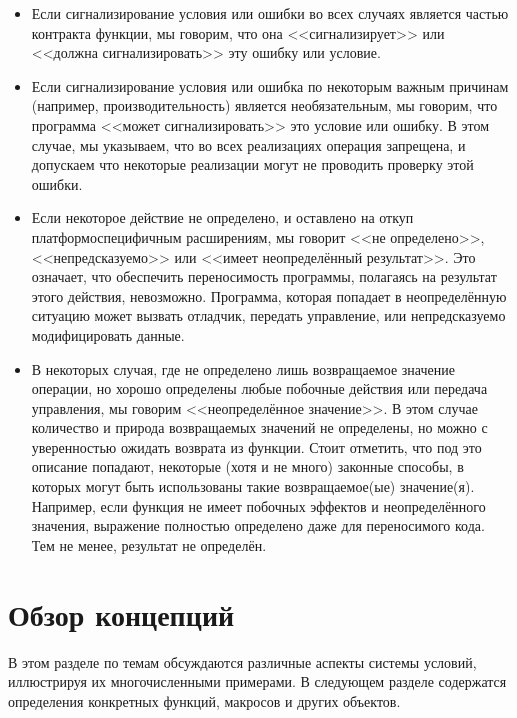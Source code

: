\begin{itemize}
\item Если сигнализирование условия или ошибки во всех случаях является частью
  контракта функции, мы говорим, что она <<сигнализирует>> или <<должна
  сигнализировать>> эту ошибку или условие.

\item Если сигнализирование условия или ошибка по некоторым важным причинам
  (например, производительность)
  является необязательным, мы говорим, что программа <<может сигнализировать>>
  это условие или ошибку. В этом случае, мы указываем, что во всех реализациях
  операция запрещена, и допускаем что некоторые реализации могут не проводить
  проверку этой ошибки.

\item Если некоторое действие не определено, и оставлено на откуп
  платформоспецифичным расширениям, мы говорит <<не определено>>,
  <<непредсказуемо>> или <<имеет неопределённый результат>>.
  Это означает, что обеспечить переносимость программы, полагаясь на результат
  этого действия, невозможно. Программа, которая попадает в неопределённую
  ситуацию может вызвать отладчик, передать управление, или непредсказуемо
  модифицировать данные.

\item В некоторых случая, где не определено лишь возвращаемое значение операции,
  но хорошо определены любые побочные действия или передача управления, мы
  говорим <<неопределённое значение>>. В этом случае количество и природа
  возвращаемых значений не определены, но можно с уверенностью ожидать возврата
  из функции.  Стоит отметить, что под это описание попадают, некоторые (хотя и
  не много) законные способы, в которых могут быть использованы такие
  возвращаемое(ые) значение(я). Например, если функция  не имеет
  побочных эффектов и неопределённого значения, выражение  полностью определено даже для переносимого кода.  Тем не менее,
  результат  не определён.
\end{itemize}

\section{Обзор концепций}

В этом разделе по темам обсуждаются различные аспекты системы условий,
иллюстрируя их многочисленными примерами. В следующем разделе содержатся
определения конкретных функций, макросов и других объектов.

